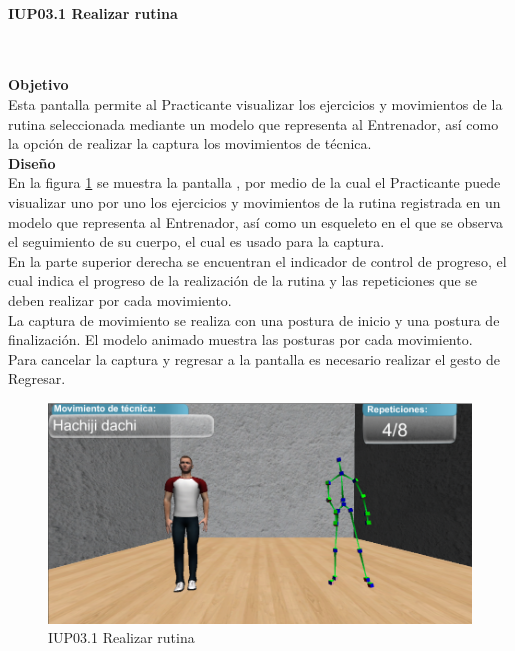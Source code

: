 \paragraph{IUP03.1 Realizar rutina} \hspace{1cm}\\ 
\label{pant:IUP03.1} 

\textbf{\textcolor[rgb]{0, 0, 0.545098}{Objetivo}}\\
Esta pantalla permite al Practicante visualizar los ejercicios y movimientos de la rutina seleccionada mediante un modelo que representa al Entrenador, así como la opción de realizar la captura los movimientos de técnica.\\

\textbf{\textcolor[rgb]{0, 0, 0.545098}{Diseño}}\\
En la figura \ref{fig:IUP03.1} se muestra la pantalla , por medio de la cual el Practicante puede visualizar uno por uno los ejercicios y movimientos de la rutina registrada en un modelo que representa al Entrenador, así como un esqueleto en el que se observa el seguimiento de su cuerpo, el cual es usado para la captura.\\

En la parte superior derecha se encuentran el indicador de control de progreso, el cual indica el progreso de la realización de la rutina y las repeticiones que se deben realizar por cada movimiento.\\

La captura de movimiento se realiza con una postura de inicio y una postura de finalización. El modelo animado muestra las posturas por cada movimiento.\\

Para cancelar la captura y regresar a la pantalla  es necesario realizar el gesto de Regresar. \\

\begin{figure}[h]
	\centering
		\includegraphics[scale=0.5]{./Figuras/Pantallas/IUP03_1Realizar_rutina}
	\caption{IUP03.1 Realizar rutina}
	\label{fig:IUP03.1}
\end{figure}

